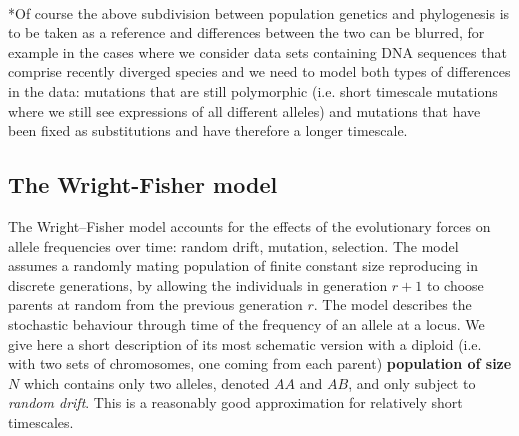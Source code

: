 \documentclass[12pt,mythesisstyle]{report}
\begin{document}
\\*Of course the above subdivision between population genetics and phylogenesis is to be taken as a reference and differences between the two can be blurred, for example in the cases where we consider data sets containing DNA sequences that comprise recently diverged species and we need to model both types of differences in the data: mutations that are still polymorphic (i.e. short timescale mutations where we still see expressions of all different alleles) and mutations that have been fixed as substitutions and have therefore a longer timescale\cite{wrightexplained}.

\subsection{The Wright-Fisher model}\label{section: wright-fisher}
The Wright–Fisher model \cite{wright1931} \cite{fisher} \cite{wrightexplained} accounts for the effects of the evolutionary forces on allele frequencies over time: random drift, mutation, selection. The model assumes a randomly mating population of finite constant size reproducing in discrete generations, by allowing the individuals in generation $r + 1$ to choose parents at random from the previous generation $r$. The model describes the stochastic behaviour through time of the frequency of an allele at a locus. We give here a short description of its most schematic version with a diploid (i.e. with two sets of chromosomes, one coming from each parent) \textbf{population of size $N$} which contains only two alleles, denoted $AA$ and $AB$, and only subject to \textit{random drift}. This is a reasonably good approximation for relatively short timescales.
\end{document}
